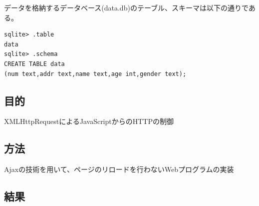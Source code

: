\documentclass[a4j]{jarticle}
\begin{document}
データを格納するデータベース(data.db)のテーブル、スキーマは以下の通りである。
\begin{screen}
\begin{verbatim}
sqlite> .table
data
sqlite> .schema
CREATE TABLE data
(num text,addr text,name text,age int,gender text);
\end{verbatim}
\end{screen}

\subsection{目的}
XMLHttpRequestによるJavaScriptからのHTTPの制御

\subsection{方法}
Ajaxの技術を用いて、ページのリロードを行わないWebプログラムの実装

\subsection{結果}
\end{document}

